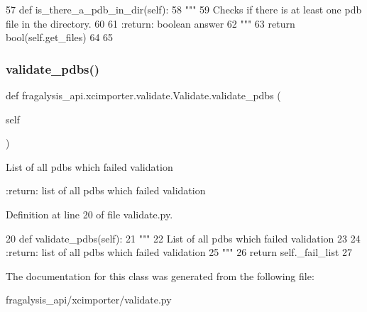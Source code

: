 \begin{DoxyCode}
57     \textcolor{keyword}{def }is\_there\_a\_pdb\_in\_dir(self):
58         \textcolor{stringliteral}{"""}
59 \textcolor{stringliteral}{        Checks if there is at least one pdb file in the directory.}
60 \textcolor{stringliteral}{}
61 \textcolor{stringliteral}{        :return: boolean answer}
62 \textcolor{stringliteral}{        """}
63         \textcolor{keywordflow}{return} bool(self.get\_files)
64 
65 
\end{DoxyCode}
\mbox{\label{classfragalysis__api_1_1xcimporter_1_1validate_1_1_validate_a1e2236300274a3e4c91944ff8a10f432}} 
\subsubsection{\texorpdfstring{validate\+\_\+pdbs()}{validate\_pdbs()}}
{\footnotesize\ttfamily def fragalysis\+\_\+api.\+xcimporter.\+validate.\+Validate.\+validate\+\_\+pdbs (\begin{DoxyParamCaption}\item[{}]{self }\end{DoxyParamCaption})}

\begin{DoxyVerb}List of all pdbs which failed validation

:return: list of all pdbs which failed validation
\end{DoxyVerb}
 

Definition at line 20 of file validate.\+py.


\begin{DoxyCode}
20     \textcolor{keyword}{def }validate\_pdbs(self):
21         \textcolor{stringliteral}{"""}
22 \textcolor{stringliteral}{        List of all pdbs which failed validation}
23 \textcolor{stringliteral}{}
24 \textcolor{stringliteral}{        :return: list of all pdbs which failed validation}
25 \textcolor{stringliteral}{        """}
26         \textcolor{keywordflow}{return} self.\_fail\_list
27 
\end{DoxyCode}


The documentation for this class was generated from the following file\+:\begin{DoxyCompactItemize}
\item 
fragalysis\+\_\+api/xcimporter/validate.\+py\end{DoxyCompactItemize}
